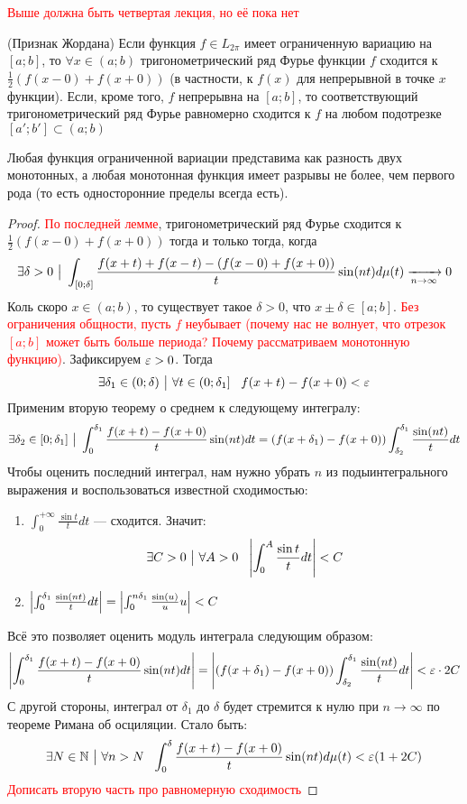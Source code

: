 \textcolor{red}{Выше должна быть четвертая лекция, но её пока нет}

\begin{theorem} (Признак Жордана)
	Если функция $f \in L_{2\pi}$ имеет ограниченную вариацию на $[a; b]$, то $\forall x \in (a; b)$ тригонометрический ряд Фурье функции $f$ сходится к $\frac{1}{2}(f(x - 0) + f(x + 0))$ (в частности, к $f(x)$ для непрерывной в точке $x$ функции). Если, кроме того, $f$ непрерывна на $[a; b]$, то соответствующий тригонометрический ряд Фурье равномерно сходится к $f$ на любом подотрезке $[a'; b'] \subset (a; b)$
\end{theorem}

\begin{reminder}
	Любая функция ограниченной вариации представима как разность двух монотонных, а любая монотонная функция имеет разрывы не более, чем первого рода (то есть односторонние пределы всегда есть).
\end{reminder}

\begin{proof}
	\textcolor{red}{По последней лемме}, тригонометрический ряд Фурье сходится к $\frac{1}{2}(f(x - 0) + f(x + 0))$ тогда и только тогда, когда
	\[
		\exists \delta > 0 \ \big|\  \int_{[0; \delta]} \frac{f(x + t) + f(x - t) - (f(x - 0) + f(x + 0))}{t}\sin(nt)d\mu(t) \xrightarrow[n \to \infty]{} 0
	\]
	Коль скоро $x \in (a; b)$, то существует такое $\delta > 0$, что $x \pm \delta \in [a; b]$. \textcolor{red}{Без ограничения общности, пусть $f$ неубывает (почему нас не волнует, что отрезок $[a; b]$ может быть больше периода? Почему рассматриваем монотонную функцию)}. Зафиксируем $\varepsilon > 0$. Тогда
	\[
		\exists \delta_1 \in (0; \delta) \ \big|\  \forall t \in \left(0; \delta_1\right]\ \ f(x + t) - f(x + 0) < \varepsilon
	\]
	Применим вторую теорему о среднем к следующему интегралу:
	\[
		\exists \delta_2 \in [0; \delta_1] \ \big|\  \int_0^{\delta_1} \frac{f(x + t) - f(x + 0)}{t}\sin(nt)dt = (f(x + \delta_1) - f(x + 0)) \int_{\delta_2}^{\delta_1} \frac{\sin(nt)}{t}dt
	\]
	Чтобы оценить последний интеграл, нам нужно убрать $n$ из подыинтегрального выражения и воспользоваться известной сходимостью:
	\begin{enumerate}
		\item $\int_0^{+\infty} \frac{\sin t}{t}dt$ --- сходится. Значит:
		\[
			\exists C > 0 \ \big|\  \forall A > 0\ \ \left|\int_0^A \frac{\sin t}{t}dt\right| < C
		\]
		
		\item \(\left|\int_0^{\delta_1} \frac{\sin(nt)}{t}dt\right| = \left|\int_0^{n\delta_1} \frac{\sin(u)}{u}u\right| < C\)
	\end{enumerate}
	Всё это позволяет оценить модуль интеграла следующим образом:
	\[
		\left|\int_0^{\delta_1} \frac{f(x + t) - f(x + 0)}{t}\sin(nt)dt\right| = \left|(f(x + \delta_1) - f(x + 0)) \int_{\delta_2}^{\delta_1} \frac{\sin(nt)}{t}dt\right| <
		\\
		\varepsilon \cdot 2C
	\]
	С другой стороны, интеграл от $\delta_1$ до $\delta$ будет стремится к нулю при $n \to \infty$ по теореме Римана об осциляции. Стало быть:
	\[
		\exists N \in \N \such \forall n > N\ \ \int_0^{\delta} \frac{f(x + t) - f(x + 0)}{t} \sin(nt)d\mu(t) < \eps(1 + 2C)
	\]
	\textcolor{red}{Дописать вторую часть про равномерную сходимость}
\end{proof}

